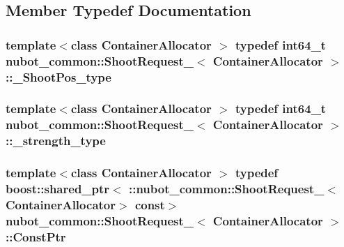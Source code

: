 \subsection{Member Typedef Documentation}
\hypertarget{structnubot__common_1_1ShootRequest___af89baff72c64a8aca97ad5a84dd2a0bf}{
\subsubsection[{\-\_\-\-Shoot\-Pos\-\_\-type}]{\setlength{\rightskip}{0pt plus 5cm}template$<$class Container\-Allocator $>$ typedef int64\-\_\-t {\bf nubot\-\_\-common\-::\-Shoot\-Request\-\_\-}$<$ Container\-Allocator $>$\-::{\bf \-\_\-\-Shoot\-Pos\-\_\-type}}}\label{structnubot__common_1_1ShootRequest___af89baff72c64a8aca97ad5a84dd2a0bf}
\hypertarget{structnubot__common_1_1ShootRequest___aceb6973d9856654d66059200ff022559}{
\subsubsection[{\-\_\-strength\-\_\-type}]{\setlength{\rightskip}{0pt plus 5cm}template$<$class Container\-Allocator $>$ typedef int64\-\_\-t {\bf nubot\-\_\-common\-::\-Shoot\-Request\-\_\-}$<$ Container\-Allocator $>$\-::{\bf \-\_\-strength\-\_\-type}}}\label{structnubot__common_1_1ShootRequest___aceb6973d9856654d66059200ff022559}
\hypertarget{structnubot__common_1_1ShootRequest___a74600e71443214b0448f619b94065e3d}{
\subsubsection[{Const\-Ptr}]{\setlength{\rightskip}{0pt plus 5cm}template$<$class Container\-Allocator $>$ typedef boost\-::shared\-\_\-ptr$<$ \-::{\bf nubot\-\_\-common\-::\-Shoot\-Request\-\_\-}$<$Container\-Allocator$>$ const$>$ {\bf nubot\-\_\-common\-::\-Shoot\-Request\-\_\-}$<$ Container\-Allocator $>$\-::{\bf Const\-Ptr}}}\label{structnubot__common_1_1ShootRequest___a74600e71443214b0448f619b94065e3d}
